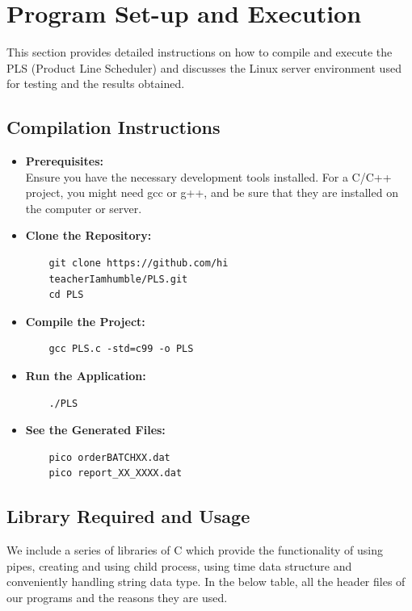 \documentclass[conference]{IEEEtran}
\begin{document}
\section{\textbf{Program Set-up and Execution}}
This section provides detailed instructions on how to compile and execute the PLS (Product Line Scheduler) and discusses the Linux server environment used for testing and the results obtained.

\subsection{Compilation Instructions}
\begin{itemize}
    \item \textbf{Prerequisites:} \\
    Ensure you have the necessary development tools installed. For a C/C++ project, you might need gcc or g++, and be sure that they are installed on the computer or server.

    \item \textbf{Clone the Repository:} \\
    \begin{verbatim}
    git clone https://github.com/hi
    teacherIamhumble/PLS.git
    cd PLS
    \end{verbatim}

    \item \textbf{Compile the Project:} \\
    \begin{verbatim}
    gcc PLS.c -std=c99 -o PLS
    \end{verbatim}

    \item \textbf{Run the Application:} \\
    \begin{verbatim}
    ./PLS
    \end{verbatim}

    \item \textbf{See the Generated Files:} \\
    \begin{verbatim}
    pico orderBATCHXX.dat
    pico report_XX_XXXX.dat
    \end{verbatim}
\end{itemize}

\subsection{Library Required and Usage}
We include a series of libraries of C which provide the functionality of using pipes, creating and using child process, using time data structure and conveniently handling string data type.
In the below table, all the header files of our programs and the reasons they are used.
\end{document}
